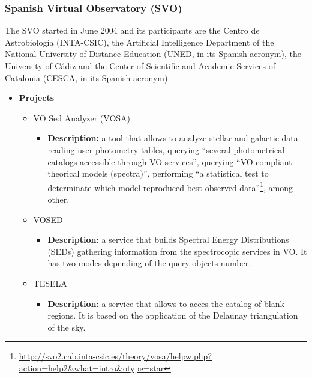 
\subsubsection{Spanish Virtual Observatory (SVO)}
The SVO started in June 2004 and its participants are the Centro de
Astrobiolog\'{i}a (INTA-CSIC), the Artificial Intelligence Department of the
National University of Distance Education (UNED, in its Spanish acronym), the
University of C\'{a}diz and the Center of Scientific and Academic Services of
Catalonia (CESCA, in its Spanish acronym).

\begin{itemize}
\item \textbf{Projects}
\begin{itemize}
\item VO Sed Analyzer (VOSA)
\begin{itemize}
\item \textbf{Description:} a tool that allows to analyze stellar and galactic
data reading user photometry-tables, querying ``several photometrical catalogs
accessible through VO services'', querying ``VO-compliant theorical models
(spectra)'', performing ``a statistical test to determinate which model
reproduced best observed
data''\footnote{\url{http://svo2.cab.inta-csic.es/theory/vosa/helpw.php?action=help2&what=intro&otype=star}},
among other. 
\end{itemize}
\item VOSED
\begin{itemize}
\item \textbf{Description:} a service that builds Spectral Energy Distributions
(SEDs) gathering information from the spectrocopic services in VO. It has two
modes depending of the query objects number.
\end{itemize}
\item TESELA
\begin{itemize}
\item \textbf{Description:} a service that allows to acces the catalog of blank
regions. It is based on the application of the Delaunay triangulation of the
sky.
\end{itemize}
\end{itemize}
\end{itemize}

